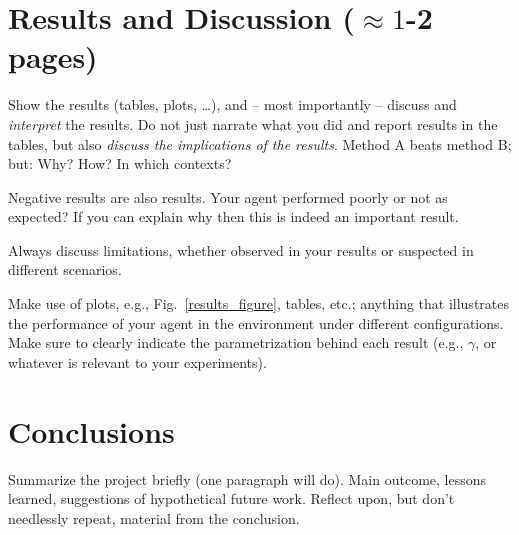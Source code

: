 \documentclass[journal, a4paper]{IEEEtran}
\begin{document}
\section{Results and Discussion ($\approx 1$-2 pages)}

Show the results (tables, plots, \ldots), and -- most importantly -- discuss and \emph{interpret} the results. Do not just narrate what you did and report results in the tables, but also \emph{discuss the implications of the results}. Method A beats method B; but: Why? How? In which contexts?

Negative results are also results. Your agent performed poorly or not as expected? If you can explain why then this is indeed an important result. 

Always discuss limitations, whether observed in your results or suspected in different scenarios. 

Make use of plots, e.g., Fig.~\ref{results_figure}, tables, etc.; anything that illustrates the performance of your agent in the environment under different configurations. Make sure to clearly indicate the parametrization behind each result (e.g., $\gamma$, or whatever is relevant to your experiments). 



\section{Conclusions}
	Summarize the project briefly (one paragraph will do). Main outcome, lessons learned, suggestions of hypothetical future work. 
	Reflect upon, but don't needlessly repeat, material from the conclusion. 
\end{document}
